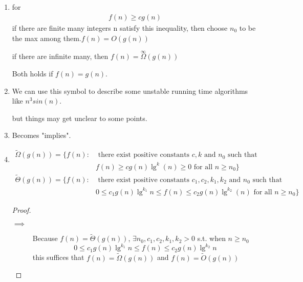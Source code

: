\documentclass[paper=a4, fontsize=11pt,oneside]{book} %
\numberwithin{equation}{section} %
\numberwithin{figure}{section} %
\numberwithin{table}{section} %
\begin{document}
		\subsection{}
			\begin{enumerate}
				\item for
			\begin{align*}
			f(n) \geq cg(n)
			\end{align*}
			if there are finite many integers n satisfy this inequality, then choose $n_0$ to be the max among them.$f(n) = O(g(n))$
			
			if there are infinite many, then $f(n) = \overset{\infty}{\Omega}(g(n))$
			
			Both holds if $f(n) = g(n)$.
			
				\item We can use this symbol to describe some unstable running time algorithms like $n^3sin(n)$.
				
				but things may get unclear to some points.
				
			\item Becomes "implies".
			
			\item \begin{align*}
			\widetilde{\Omega}(g(n)) = \{ f(n) :& \text{ there exist positive constants } c,k \text{ and } n_0 \text{ such that} \\
			&f(n) \geq cg(n)\lg^k(n) \geq 0 \text{ for all } n \geq n_0 
			\}
			\end{align*}
			 \begin{align*}
			 \widetilde{\Theta}(g(n)) = \{ f(n) :& \text{ there exist positive constants } c_1,c_2,k_1,k_2 \text{ and } n_0 \text{ such that} \\
			 &0 \leq c_1g(n)\lg^{k_1}n \leq f(n) \leq c_2g(n)\lg^{k_2}(n) \text{ for all } n \geq n_0 
			 \}
			 \end{align*}
			 		\begin{proof}
			 			\begin{description}
			 				\item[$\implies$]
			 				Because  $f(n) = \widetilde{\Theta}(g(n))$, $\exists n_0, c_1, c_2, k_1, k_2 > 0$ s.t. when $n \geq n_0$
			 				\begin{equation*}
			 				0 \leq c_1g(n)\lg^{k_1}n \leq f(n) \leq c_2g(n)\lg^{k_2}n
			 				\end{equation*}
			 				this suffices that $f(n) = \widetilde{\Omega}(g(n))$ and $f(n) = \widetilde{O}(g(n))$
			 				

\end{description}
\end{proof}
\end{enumerate}
\end{document}
